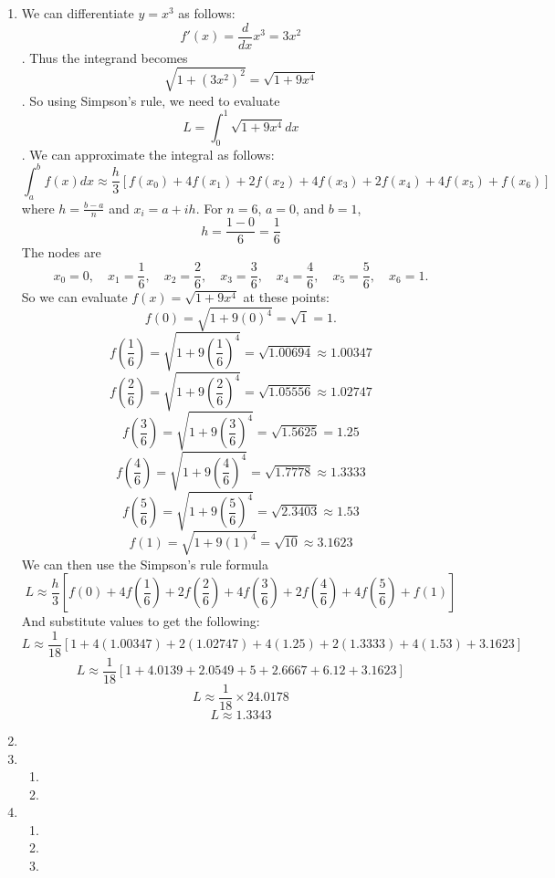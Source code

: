 \documentclass[12pt]{article}
\begin{document}
\begin{enumerate}[leftmargin=2em]
    \item We can differentiate $y=x^{3}$ as follows:
    \[ f'(x) = \frac{d}{dx}x^{3} = 3x^{2}\].
    Thus the integrand becomes 
    \[\sqrt{1+(3x^{2})^{2}} = \sqrt{1+9x^{4}}\].
    So using Simpson's rule, we need to evaluate 
    \[L = \int_{0}^{1}\sqrt{1+9x^{4}}dx\].
    We can approximate the integral as follows:
    \[\int_{a}^{b}f(x)dx \approx \frac{h}{3}[f(x_0)+4f(x_1)+2f(x_2)+4f(x_3)+2f(x_4)+4f(x_5)+f(x_6)]\]
    where $h = \frac{b-a}{n}$ and $x_i = a+ih$.
    For $n=6$, $a=0$, and $b=1$,
    \[h=\frac{1-0}{6} = \frac{1}{6}\]
    The nodes are
    \[x_0 = 0, \quad x_1 = \frac{1}{6}, \quad x_2 = \frac{2}{6}, \quad x_3 = \frac{3}{6}, \quad x_4 = \frac{4}{6}, \quad x_5 = \frac{5}{6}, \quad x_6 = 1.\]
    So we can evaluate $f(x) = \sqrt{1+9x^4}$ at these points:
    \[f(0) = \sqrt{1 + 9(0)^4} = \sqrt{1} = 1.\]
    \[f\left(\frac{1}{6}\right) = \sqrt{1 + 9\left(\frac{1}{6}\right)^4} = \sqrt{1.00694} \approx 1.00347\]
    \[f\left(\frac{2}{6}\right) = \sqrt{1 + 9\left(\frac{2}{6}\right)^4} = \sqrt{1.05556} \approx 1.02747\]
    \[f\left(\frac{3}{6}\right) = \sqrt{1 + 9\left(\frac{3}{6}\right)^4} = \sqrt{1.5625} = 1.25\]
    \[f\left(\frac{4}{6}\right) = \sqrt{1 + 9\left(\frac{4}{6}\right)^4} = \sqrt{1.7778} \approx 1.3333\]
    \[f\left(\frac{5}{6}\right) = \sqrt{1 + 9\left(\frac{5}{6}\right)^4} = \sqrt{2.3403} \approx 1.53\]
    \[f(1) = \sqrt{1 + 9(1)^4} = \sqrt{10} \approx 3.1623\]
    We can then use the Simpson's rule formula
    \[L \approx \frac{h}{3} \left[ f(0) + 4f\left(\frac{1}{6}\right) + 2f\left(\frac{2}{6}\right) + 4f\left(\frac{3}{6}\right) + 2f\left(\frac{4}{6}\right) + 4f\left(\frac{5}{6}\right) + f(1) \right]\]
    And substitute values to get the following:
    \[L \approx \frac{1}{18} \left[ 1 + 4(1.00347) + 2(1.02747) + 4(1.25) + 2(1.3333) + 4(1.53) + 3.1623 \right]\]
    \[L \approx \frac{1}{18} \left[ 1 + 4.0139 + 2.0549 + 5 + 2.6667 + 6.12 + 3.1623 \right]\]
    \[L \approx \frac{1}{18} \times 24.0178\]
    \[L \approx 1.3343\]


    \item 

    \item
    \begin{enumerate}[leftmargin=!]
        \item 

        \item 
    \end{enumerate}
    
    \item 
    \begin{enumerate}[leftmargin=!]
        \item 

        \item

        \item
    \end{enumerate}
\end{enumerate}
\end{document}
